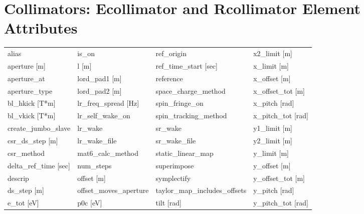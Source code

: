  \section{Collimators: Ecollimator and Rcollimator Element Attributes}
 \label{s:list.collimator}
 
 \begin{tabular}{llll} \toprule
alias                            & is_on                            & ref_origin                       & x2_limit [m]                     \\
aperture [m]                     & l [m]                            & ref_time_start [sec]             & x_limit [m]                      \\
aperture_at                      & lord_pad1 [m]                    & reference                        & x_offset [m]                     \\
aperture_type                    & lord_pad2 [m]                    & space_charge_method              & x_offset_tot [m]                 \\
bl_hkick [T*m]                   & lr_freq_spread [Hz]              & spin_fringe_on                   & x_pitch [rad]                    \\
bl_vkick [T*m]                   & lr_self_wake_on                  & spin_tracking_method             & x_pitch_tot [rad]                \\
create_jumbo_slave               & lr_wake                          & sr_wake                          & y1_limit [m]                     \\
csr_ds_step [m]                  & lr_wake_file                     & sr_wake_file                     & y2_limit [m]                     \\
csr_method                       & mat6_calc_method                 & static_linear_map                & y_limit [m]                      \\
delta_ref_time [sec]             & num_steps                        & superimpose                      & y_offset [m]                     \\
descrip                          & offset [m]                       & symplectify                      & y_offset_tot [m]                 \\
ds_step [m]                      & offset_moves_aperture            & taylor_map_includes_offsets      & y_pitch [rad]                    \\
e_tot [eV]                       & p0c [eV]                         & tilt [rad]                       & y_pitch_tot [rad]                \\

\end{tabular}
